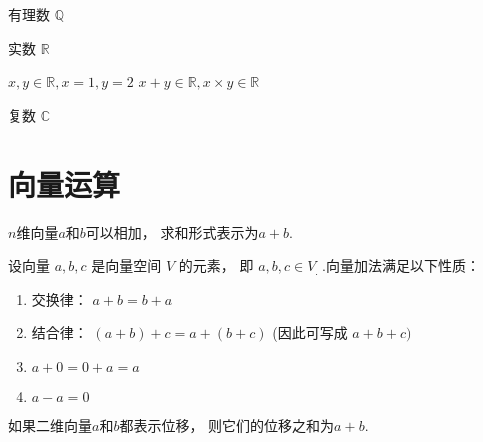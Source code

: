 \begin{example}
    有理数 $ \mathbb{Q} $
\end{example}

\begin{example}
    实数 $ \mathbb{R} $

    $ x, y \in \mathbb{R}, x=1, y=2 $
    $ x+y \in \mathbb{R}  ,x \times y \in \mathbb{R} $
\end{example}

\begin{example}
    复数 $ \mathbb{C} $
\end{example}

\section{向量运算}

\begin{definition}[向量加法]
    $n$维向量$a$和$b$可以相加， 求和形式表示为$a + b$.
\end{definition}

\begin{theorem}
    设向量 $  a, {b}, {c}  $ 是向量空间 $  V  $ 的元素， 即 $  a, {b}, {c} \in V_{\text {.  }}  $.向量加法满足以下性质：

    \begin{enumerate}
        \item 交换律： $  a+b=b+a  $
        \item 结合律： $  (a+b)+c=a+(b+c)  $ (因此可写成 $  a+{b}+{c})  $
        \item $  a+0=0+a=a  $
        \item $  a-a=0  $
    \end{enumerate}
\end{theorem}

\begin{corollary}[向量位移相加]
    如果二维向量$a$和$b$都表示位移， 则它们的位移之和为$a + b$.
\end{corollary}

